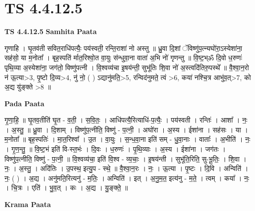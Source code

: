 \documentclass[17pt]{extarticle}
\begin{document}
\section{ TS 4.4.12.5 }

\textbf{TS 4.4.12.5 } \newline
\textbf{Samhita Paata} \newline

गृणाहि । घृ॒तव॑ती सवित॒राधि॑पत्यैः॒ पय॑स्वती॒ रन्ति॒राशा॑ नो अस्तु ॥ ध्रु॒वा दि॒शां ॅविष्णु॑प॒त्न्यघो॑रा॒ऽस्येशा॑ना॒ सह॑सो॒ या म॒नोता᳚ । बृह॒स्पति॑ र्मात॒रिश्वो॒त वा॒युः स॑न्धुवा॒ना वाता॑ अ॒भि नो॑ गृणन्तु ॥ वि॒ष्ट॒भ्ॐ दि॒वो ध॒रुणः॑ पृथि॒व्या अ॒स्येशा॑ना॒ जग॑तो॒ विष्णु॑पत्नी । वि॒श्वव्य॑चा इ॒षय॑न्ती॒ सुभू॑तिः शि॒वा नो॑ अ॒स्त्वदि॑तिरु॒पस्थे᳚ ॥ वै॒श्वा॒न॒रो न॑ ऊ॒त्या>3, पृ॒ष्टो दि॒व्य>4, नु॑ नो॒ ( ) ऽद्यानु॑मति॒>5, रन्विद॑नुमते॒ त्वं >6, कया॑ नश्चि॒त्र आभु॑व॒त्>7, को अ॒द्य यु॑ङ्क्ते >8 ॥ \newline

\textbf{Pada Paata} \newline

गृ॒णा॒हि॒ ॥ घृ॒तव॒तीति॑ घृ॒त - व॒ती॒ । स॒वि॒तः॒ । आधि॑पत्यै॒रित्याधि॑-प॒त्यैः॒ । पय॑स्वती । रन्तिः॑ । आशा᳚ । नः॒ । अ॒स्तु॒ ॥ ध्रु॒वा । दि॒शाम् । विष्णु॑प॒त्नीति॒ विष्णु॑ - प॒त्नी॒ । अघो॑रा । अ॒स्य । ईशा॑ना । सह॑सः । या । म॒नोता᳚ ॥ बृह॒स्पतिः॑ । मा॒त॒रिश्वा᳚ । उ॒त । वा॒युः । स॒न्ध॒वा॒ना इति॑ सम् - धु॒वा॒नाः । वाताः᳚ । अ॒भीति॑ । नः॒ । गृ॒ण॒न्तु॒ ॥ वि॒ष्ट॒भं इति॑ वि-स्त॒भंः । दि॒वः । ध॒रुणः॑ । पृ॒थि॒व्याः । अ॒स्य । ईशा॑ना । जग॑तः । विष्णु॑प॒त्नीति॒ विष्णु॑ - प॒त्नी॒ ॥ वि॒श्वव्य॑चा॒ इति॑ वि॒श्व - व्य॒चाः॒ । इ॒षय॑न्ती । सुभू॑ति॒रिति॒ सु-भू॒तिः॒ । शि॒वा । नः॒ । अ॒स्तु॒ । अदि॑तिः । उ॒पस्थ॒ इत्यु॒प - स्थे॒ ॥ वै॒श्वा॒न॒रः । नः॒ । ऊ॒त्या । पृ॒ष्टः । दि॒वि । अन्विति॑ । नः॒ ( ) । अ॒द्य । अनु॑मति॒रित्यनु॑ - म॒तिः॒ । अन्विति॑ । इत् । अ॒नु॒म॒त॒ इत्य॑नु - म॒ते॒ । त्वम् । कया᳚ । नः॒ । चि॒त्रः । एति॑ । भु॒व॒त् । कः । अ॒द्य । यु॒ङ्क्ते॒ ॥  \newline


\textbf{Krama Paata} \newline
\end{document}
